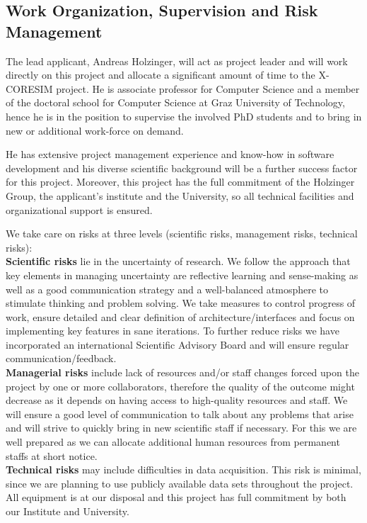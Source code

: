 \documentclass[a4paper,11pt]{article}
\begin{document}
\subsection{Work Organization, Supervision and Risk Management}

The lead applicant, Andreas Holzinger, will act as project leader and will work directly on this project and allocate a significant amount of time to the X-CORESIM project. He is associate professor for Computer Science and a member of the doctoral school for Computer Science at Graz University of Technology, hence he is in the position to supervise the involved PhD students and to bring in new or additional work-force on demand.

He has extensive project management experience and know-how in software development and his diverse scientific background will be a further success factor for this project. Moreover, this project has the full commitment of the Holzinger Group, the applicant's institute and the University, so all technical facilities and organizational support is ensured.

We take care on risks at three levels (scientific risks, management risks, technical risks):
\\[0,2cm]
\textbf{Scientific risks} lie in the uncertainty of research. We follow the approach that key elements in managing uncertainty are reflective learning and sense-making as well as a good communication strategy and a well-balanced atmosphere to stimulate thinking and problem solving. 
We take measures to control progress of work, ensure detailed and clear definition of architecture/interfaces and focus on implementing key features in sane iterations. To further reduce risks we have incorporated an international Scientific Advisory Board and will ensure regular communication/feedback. 
\\[0,2cm]
\textbf{Managerial risks} include lack of resources and/or staff changes forced upon the project by one or more collaborators, therefore the quality of the outcome might decrease as it depends on having access to high-quality resources and staff. We will ensure a good level of communication to talk about any problems that arise and will strive to quickly bring in new scientific staff if necessary. For this we are well prepared as we can allocate additional human resources from permanent staffs at short notice.
\\[0,2cm]
\textbf{Technical risks} may include difficulties in data acquisition. This risk is minimal, since we are planning to use publicly available data sets throughout the project. All equipment is at our disposal and this project has full commitment by both our Institute and University.
\end{document}
